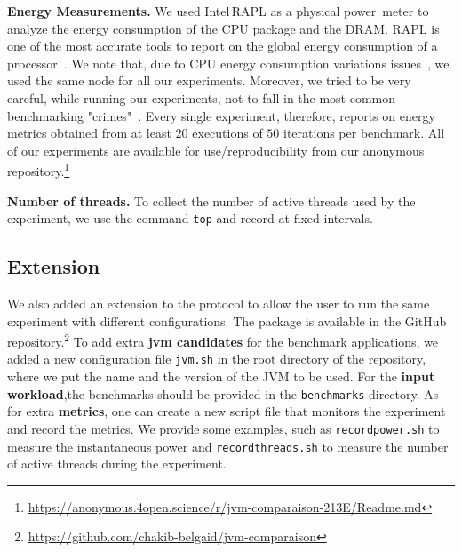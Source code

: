 
\noindent\textbf{Energy Measurements.}
We used Intel\,RAPL as a physical power~meter to analyze the energy consumption of the CPU package and the DRAM.
RAPL is one of the most accurate tools to report on the global energy consumption of a processor~\cite{Khan:2018:RAE:3199681.3177754,10.1145/2989081.2989088}.
We note that, due to CPU energy consumption variations issues~\cite{opaper}, we used the same node for all our experiments.
Moreover, we tried to be very careful, while running our experiments, not to fall in the most common benchmarking "crimes"~\cite{DBLP:journals/corr/abs-1801-02381}.
Every single experiment, therefore, reports on energy metrics obtained from at least $20$ executions of $50$ iterations per benchmark.
All of our experiments are available for use/reproducibility from our anonymous repository.\footnote{\url{https://anonymous.4open.science/r/jvm-comparaison-213E/Readme.md}}


\noindent\textbf{Number of threads.}
To collect the number of active threads used by the experiment, we use the command \texttt{top} and record at fixed intervals.

\subsection{Extension}
We also added an extension to the protocol to allow the user to run the same experiment with different configurations.
The package is available in the GitHub repository.\footnote{\url{https://github.com/chakib-belgaid/jvm-comparaison}}
To add extra \textbf{jvm candidates} for the benchmark applications, we added a new configuration file \texttt{jvm.sh} in the root directory of the repository, where we put the name and the version of the JVM to be used.
For the \textbf{input workload},the benchmarks should be provided in the \texttt{benchmarks} directory.
As for extra \textbf{metrics}, one can create a new script file that monitors the experiment and record the metrics.
We provide some examples, such as \texttt{recordpower.sh} to measure the instantaneous power and \texttt{recordthreads.sh} to measure the number of active threads during the experiment.

